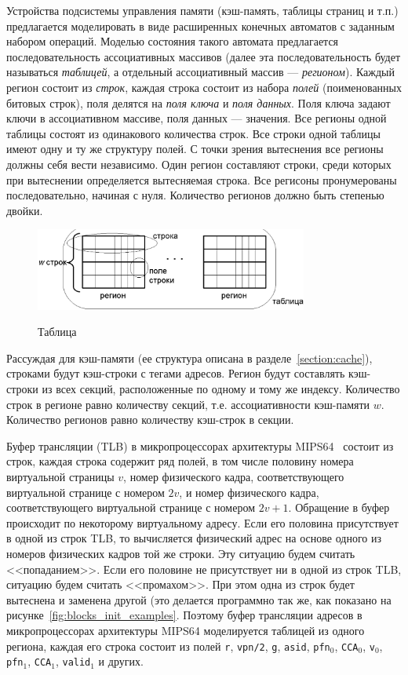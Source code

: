 Устройства подсистемы управления памяти (кэш-память, таблицы страниц и т.п.) предлагается моделировать в виде расширенных конечных автоматов с заданным набором операций. Моделью состояния такого автомата предлагается последовательность ассоциативных массивов (далее эта последовательность будет называться \emph{таблицей}, а отдельный ассоциативный массив --- \emph{регионом}). Каждый регион состоит из \emph{строк}, каждая строка состоит из набора \emph{полей} (поименованных битовых строк), поля делятся на \emph{поля ключа} и \emph{поля данных}. Поля ключа задают ключи в ассоциативном массиве, поля данных --- значения. Все регионы одной таблицы состоят из одинакового количества строк. Все строки одной таблицы имеют одну и ту же структуру полей. С точки зрения вытеснения все регионы должны себя вести независимо. Один регион составляют строки, среди которых при вытеснении определяется вытесняемая строка. Все регисоны пронумерованы последовательно, начиная с нуля. Количество регионов должно быть степенью двойки.\\

\begin{figure}[h] \center
  \includegraphics[width=0.8\textwidth]{2.theor/table}\\
  \caption{Таблица}\label{table_picture}
\end{figure}

Рассуждая для кэш-памяти (ее структура описана в разделе~\ref{section:cache}), строками будут кэш-строки с тегами адресов. Регион будут составлять кэш-строки из всех секций, расположенные по одному и тому же индексу. Количество строк в регионе  равно количеству секций, т.е. ассоциативности кэш-памяти $w$. Количество регионов равно количеству кэш-строк в секции.

Буфер трансляции (TLB) в микропроцессорах архитектуры MIPS64~\cite{mips64III} состоит из строк, каждая строка содержит ряд полей, в том числе половину номера виртуальной страницы $v$, номер физического кадра, соответствующего виртуальной странице с номером $2v$, и номер физического кадра, соответствующего виртуальной странице с номером $2v+1$. Обращение в буфер происходит по некоторому виртуальному адресу. Если его половина присутствует в одной из строк TLB, то вычисляется физический адрес на основе одного из номеров физических кадров той же строки. Эту ситуацию будем считать <<попаданием>>. Если его половине не присутствует ни в одной из строк TLB, ситуацию будем считать <<промахом>>. При этом одна из строк будет вытеснена и заменена другой (это делается программно так же, как показано на рисунке~\ref{fig:blocks_init_examples}. Поэтому буфер трансляции адресов в микропроцессорах архитектуры
MIPS64 моделируется таблицей из одного региона, каждая его строка состоит из полей \texttt{r}, \texttt{vpn/2}, \texttt{g}, \texttt{asid}, \texttt{pfn}$_0$, \texttt{CCA}$_0$, \texttt{v}$_0$, \texttt{pfn}$_1$, \texttt{CCA}$_1$, \texttt{valid}$_1$ и других.

